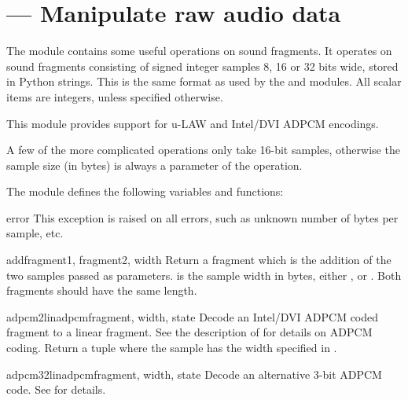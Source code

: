 \section{ ---
         Manipulate raw audio data}



The  module contains some useful operations on sound
fragments.  It operates on sound fragments consisting of signed
integer samples 8, 16 or 32 bits wide, stored in Python strings.  This
is the same format as used by the  and 
modules.  All scalar items are integers, unless specified otherwise.

This module provides support for u-LAW and Intel/DVI ADPCM encodings.

A few of the more complicated operations only take 16-bit samples,
otherwise the sample size (in bytes) is always a parameter of the
operation.

The module defines the following variables and functions:

\begin{excdesc}{error}
This exception is raised on all errors, such as unknown number of bytes
per sample, etc.
\end{excdesc}

\begin{funcdesc}{add}{fragment1, fragment2, width}
Return a fragment which is the addition of the two samples passed as
parameters.   is the sample width in bytes, either
,  or .  Both fragments should have the same
length.
\end{funcdesc}

\begin{funcdesc}{adpcm2lin}{adpcmfragment, width, state}
Decode an Intel/DVI ADPCM coded fragment to a linear fragment.  See
the description of  for details on ADPCM coding.
Return a tuple  where the sample
has the width specified in .
\end{funcdesc}

\begin{funcdesc}{adpcm32lin}{adpcmfragment, width, state}
Decode an alternative 3-bit ADPCM code.  See 
for details.
\end{funcdesc}

